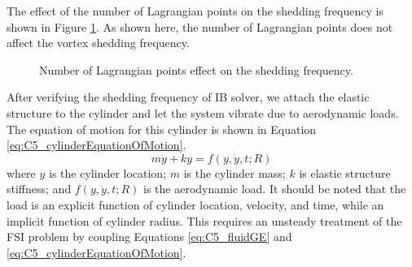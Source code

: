 %
The effect of the number of Lagrangian points on the shedding frequency is shown in Figure \ref{fig:C5_numberOfLagrangianOnSheddingFreq}. As shown here, the number of Lagrangian points does not affect the vortex shedding frequency.
%
\begin{figure}[H]
    \centering
    \quad
    \caption{Number of Lagrangian points effect on the shedding frequency.}
    \label{fig:C5_numberOfLagrangianOnSheddingFreq}
\end{figure}
%
After verifying the shedding frequency of IB solver, we attach the elastic structure to the cylinder and let the system vibrate due to aerodynamic loads. The equation of motion for this cylinder is shown in Equation \eqref{eq:C5_cylinderEquationOfMotion}.
%
\begin{equation}\label{eq:C5_cylinderEquationOfMotion}
	m \ddot{y} + k y = f(y, \dot{y}, t; R)
\end{equation}
%
where $y$ is the cylinder location; $m$ is the cylinder mass; $k$ is elastic structure stiffness; and $f(y, \dot{y}, t; R)$ is the aerodynamic load. It should be noted that the load is an explicit function of cylinder location, velocity, and time, while an implicit function of cylinder radius. This requires an unsteady treatment of the FSI problem by coupling Equations \eqref{eq:C5_fluidGE} and \eqref{eq:C5_cylinderEquationOfMotion}.

